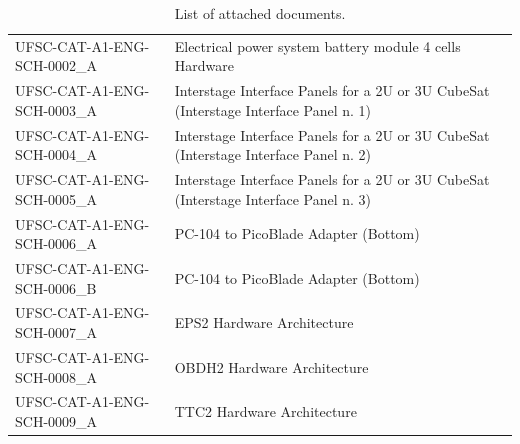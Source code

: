 \begin{table}[H]
\begin{tabular}{lp{10cm}}
        UFSC-CAT-A1-ENG-SCH-0002\_A & Electrical power system battery module 4 cells Hardware\\
        UFSC-CAT-A1-ENG-SCH-0003\_A & Interstage Interface Panels for a 2U or 3U CubeSat (Interstage Interface Panel n. 1)\\
        UFSC-CAT-A1-ENG-SCH-0004\_A & Interstage Interface Panels for a 2U or 3U CubeSat (Interstage Interface Panel n. 2)\\
        UFSC-CAT-A1-ENG-SCH-0005\_A & Interstage Interface Panels for a 2U or 3U CubeSat (Interstage Interface Panel n. 3)\\
        UFSC-CAT-A1-ENG-SCH-0006\_A & PC-104 to PicoBlade Adapter (Bottom)\\
        UFSC-CAT-A1-ENG-SCH-0006\_B & PC-104 to PicoBlade Adapter (Bottom)\\
        UFSC-CAT-A1-ENG-SCH-0007\_A & EPS2 Hardware Architecture\\
        UFSC-CAT-A1-ENG-SCH-0008\_A & OBDH2 Hardware Architecture\\
        UFSC-CAT-A1-ENG-SCH-0009\_A & TTC2 Hardware Architecture\\
        \bottomrule[1.5pt]
    \end{tabular}
    \caption{List of attached documents.}
    \label{tab:attached-documents}
\end{table}